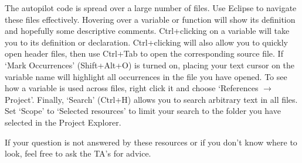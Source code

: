 \documentclass{article}
\begin{document}
The autopilot code is spread over a large number of files. Use Eclipse to navigate these files effectively. Hovering over a variable or function will show its definition and hopefully some descriptive comments. Ctrl+clicking on a variable will take you to its definition or declaration. Ctrl+clicking will also allow you to quickly open header files, then use Ctrl+Tab to open the corresponding source file.
If `Mark Occurrences' (Shift+Alt+O) is turned on, placing your text cursor on the variable name will highlight all occurrences in the file you have opened.
To see how a variable is used across files, right click it and choose `References $\rightarrow$ Project'.
Finally, `Search' (Ctrl+H) allows you to search arbitrary text in all files. Set `Scope' to `Selected resources' to limit your search to the folder you have selected in the Project Explorer.

If your question is not answered by these resources or if you don't know where to look, feel free to ask the TA's for advice.
\end{document}
